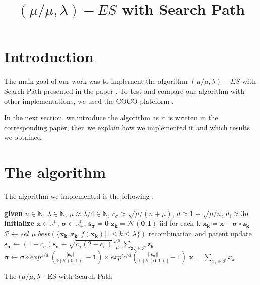 \documentclass[transmag]{IEEEtran}
\begin{document}
\title{$(\mu/\mu,\lambda)-ES$ with Search Path}


\author{
\and
{}
\and
{}
\and
{}
}


\maketitle

\begin{abstract}

\end{abstract}

\IEEEpeerreviewmaketitle


\section{Introduction}


The main goal of our work was to implement the algorithm $(\mu/\mu,\lambda)-ES$  with Search Path presented in the paper \cite{algo}. To test and compare our algorithm with other implementations, we used the COCO plateform \cite{coco}. 

In the next section, we introduce the algorithm as it is written in the corresponding paper, then we explain how we implemented it and which results we obtained. 

\section{The algorithm}

The algorithm we implemented is the following : 

\begin{algorithm}
\begin{algorithmic}[1]
\State \textbf{given} $n \in \mathbb{N}$, $\lambda \in \mathbb{N}$, $\mu \approx \lambda/4 \in \mathbb{N}$,  $c_{\sigma} \approx \sqrt{\mu /(n+\mu)}$, $ d \approx 1 + \sqrt{\mu/n}$, $d_i \approx 3n$
\State \textbf{initialize} $\bm{x} \in \mathbb{R}^n $, $\bm{\sigma} \in \mathbb{R}^n _+ $, $\bm{s_{\sigma}} =\bm{0}$
    	\State $\bm{z_k} = \mathcal{N}(\bm{0}, \bm{I})$  iid for each k
    	\State $ \bm{x_k} = \bm{x} + \bm{\sigma} \circ \bm{z_k}$
	\EndFor
    \State $\mathcal{P} \leftarrow sel\_\mu\_best(\{\bm{x_k}, \bm{z_k}, f(\bm{x_k})|1\leq k \leq \lambda \})$ recombination and parent update
    \State $\bm{s_{\sigma}} \leftarrow (1 - c_{\sigma})\bm{s_{\sigma}} + \sqrt{c_{\sigma}(2-c_{\sigma})}\frac{\sqrt{\mu}}{\mu}\sum_{\bm{z_k}\in \mathcal{P}}\bm{z_k} $
    \State $\bm{\sigma} \leftarrow \bm{\sigma} \circ exp^{1/d_i}(\frac{|\bm{s_{\sigma}}|}{\mathbb{E}|\mathcal{N}(0,1)|}-\bm{1}) \times exp^{c_{\sigma}/d}(\frac{||\bm{s_{\sigma}}||}{\mathbb{E}||\mathcal{N}(\bm{0},\bm{1})||}-1) $
    \State $ \bm{x} = \sum_{x_k \in \mathcal{P}} x_k$
\EndWhile
\end{algorithmic}
 \caption{The $(\mu / \mu, \lambda$ - ES with Search Path}
\end{algorithm}
\end{document}
